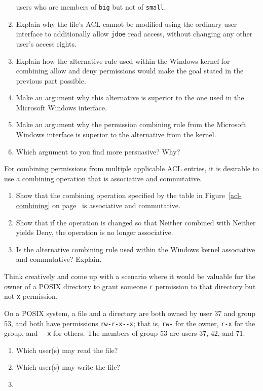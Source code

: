 \begin{chapterEnumerate}
\begin{enumerate}
users who are members of \verb|big| but not of \verb|small|.
\item
Explain why the file's ACL cannot be modified using the ordinary user
interface to additionally allow
\verb|jdoe| read access, without changing any other user's access
rights.
\item
Explain how the alternative rule used within the Windows kernel for combining allow and deny permissions
would make the goal stated in the previous part possible.
\item
Make an argument why this alternative is superior to the one used in
the Microsoft Windows interface.
\item
Make an argument why the permission combining rule from the Microsoft
Windows interface is superior to the alternative from the kernel.
\item
Which argument to you find more persuasive?  Why?
\end{enumerate}
\item
For combining permissions from multiple applicable ACL entries, it is
desirable to use a combining operation that is associative and
commutative.
\begin{enumerate}
\item
Show that the combining operation specified by the table in
Figure~\ref{acl-combining} on page~\pageref{acl-combining} is associative and commutative.
\item
Show that if the operation is changed so that Neither combined with
Neither yields Deny, the operation is no longer associative.
\item
Is the alternative combining rule used within the Windows kernel associative and commutative?  Explain.
\end{enumerate}
\item\label{r-but-not-x-exercise}
Think creatively and come up with a scenario where it would be
valuable for the owner of a POSIX directory to grant someone \texttt{r}
permission to that directory but not \texttt{x} permission.
\item
On a POSIX system, a file and a directory are both owned by user 37 and group 53, and
both have permissions \verb|rw-r-x--x|; that is, \verb|rw-| for the owner, \verb|r-x| for
the group, and \verb|--x| for others.  The members of group 53 are users 37,
42, and 71.
\begin{enumerate}
\item
Which user(s) may read the file?
\item
Which user(s) may write the file?
\item

\end{enumerate}
\end{chapterEnumerate}
